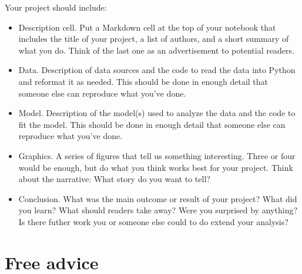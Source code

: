 \documentclass[11pt]{article}
\begin{document}
\begin{itemize}
        Your project should include:
        \begin{itemize}
          \item Description cell.  Put a Markdown cell at the top of your notebook that
                includes the title of your project, a list of authors, and a short summary of
                what you do.  Think of the last one as an advertisement to potential readers.
          \item Data.  Description of data sources and the code to read the data into
                Python and reformat it as needed. This should be done in enough detail that
                someone else can reproduce what you've done.
          \item Model.  Description of the model(s) used to analyze the data and
                the code to fit the model. This should be done in enough detail
                that someone else can reproduce what you've done.
          \item Graphics.  A series of figures that tell us something interesting. Three
                or four would be enough, but do what you think works best for your project.
                Think about the narrative:  What story do you want to tell?
          \item Conclusion. What was the main outcome or result of your project?
                What did you learn? What should readers take away? Were you surprised
                by anything? Is there futher work you or someone else could to do
                extend your analysis?
        \end{itemize}

\end{itemize}


\section*{Free advice}
\end{document}
